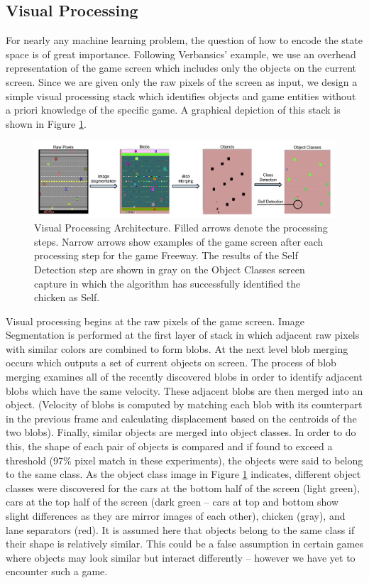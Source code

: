 \documentclass{acm_proc_article-sp}
\begin{document}
\subsection{Visual Processing}

For nearly any machine learning problem, the question of how to encode the state space is of great importance. Following Verbansics' example, we use an overhead representation of the game screen which includes only the objects on the current screen. Since we are given only the raw pixels of the screen as input, we design a simple visual processing stack which identifies objects and game entities without a priori knowledge of the specific game. A graphical depiction of this stack is shown in Figure \ref{fig:visproc}.

\begin{figure}[htp]
\begin{center}
\includegraphics[width=\textwidth]{figures/AtariArch}
\end{center}
\caption{Visual Processing Architecture. Filled arrows denote the processing steps. Narrow arrows show examples of the game screen after each processing step for the game Freeway. The results of the Self Detection step are shown in gray on the Object Classes screen capture in which the algorithm has successfully identified the chicken as Self.}
\label{fig:visproc}
\end{figure}

Visual processing begins at the raw pixels of the game screen. Image Segmentation is performed at the first layer of stack in which adjacent raw pixels with similar colors are combined to form blobs. At the next level blob merging occurs which outputs a set of current objects on screen. The process of blob merging examines all of the recently discovered blobs in order to identify adjacent blobs which have the same velocity. These adjacent blobs are then merged into an object. (Velocity of blobs is computed by matching each blob with its counterpart in the previous frame and calculating displacement based on the centroids of the two blobs). Finally, similar objects are merged into object classes. In order to do this, the shape of each pair of objects is compared and if found to exceed a threshold (97\% pixel match in these experiments), the objects were said to belong to the same class. As the object class image in Figure \ref{fig:visproc} indicates, different object classes were discovered for the cars at the bottom half of the screen (light green), cars at the top half of the screen (dark green -- cars at top and bottom show slight differences as they are mirror images of each other), chicken (gray), and lane separators (red). It is assumed here that objects belong to the same class if their shape is relatively similar. This could be a false assumption in certain games where objects may look similar but interact differently -- however we have yet to encounter such a game.
\end{document}
